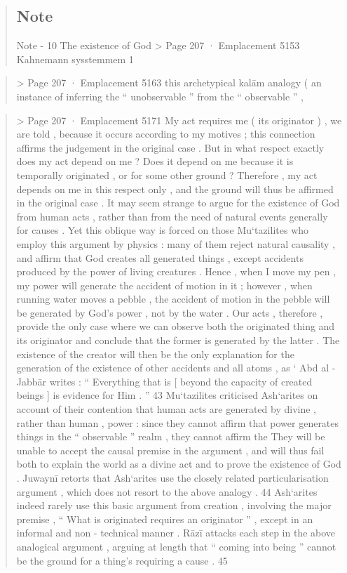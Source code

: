 \begin{quote}
\subsection{Note}
Note - 10 The existence of God > Page 207 · Emplacement 5153
Kahnemann sysstemmem 1
\end{quote} \begin{quote} > Page 207 · Emplacement 5163
this archetypical kalām analogy ( an instance of inferring the “ unobservable ” from the “ observable ” ,
\end{quote} \begin{quote} > Page 207 · Emplacement 5171
My act requires me ( its originator ) , we are told , because it occurs according to my motives ; this connection affirms the judgement in the original case . But in what respect exactly does my act depend on me ? Does it depend on me because it is temporally originated , or for some other ground ?
Therefore , my act depends on me in this respect only , and the ground will thus be affirmed in the original case . It may seem strange to argue for the existence of God from human acts , rather than from the need of natural events generally for causes . Yet this oblique way is forced on those Mu‘tazilites who employ this argument by
physics : many of them reject natural causality , and affirm that God creates all generated things , except accidents produced by the power of living creatures . Hence , when I move my pen , my power will generate the accident of motion in it ; however , when running water moves a pebble , the accident of motion in the pebble will be generated by God’s power , not by the water . Our acts , therefore , provide the only case where we can observe both the originated thing and its originator and conclude that the former is generated by the latter . The existence of the creator will then be the only explanation for the generation of the existence of other accidents and all atoms , as ‘ Abd al - Jabbār writes : “ Everything that is [ beyond the capacity of created beings ] is evidence for Him . ” 43 Mu‘tazilites criticised Ash‘arites on account of their contention that human acts are generated by divine , rather than human , power : since they cannot affirm that power generates things in the “ observable ” realm , they cannot affirm the
They will be unable to accept the causal premise in the argument , and will thus fail both to explain the world as a divine act and to prove the existence of God . Juwaynī retorts that Ash‘arites use the closely related particularisation argument , which does not resort to the above analogy . 44 Ash‘arites indeed rarely use this basic argument from creation , involving the major premise , “ What is originated requires an originator ” , except in an informal and non - technical manner . Rāzī attacks each step in the above analogical argument , arguing at length that “ coming into being ” cannot be the ground for a thing’s requiring a cause . 45

\end{quote}
